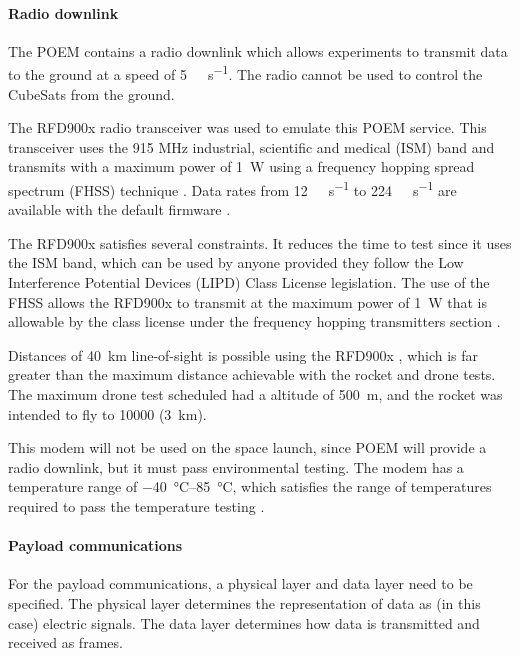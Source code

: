 \documentclass[a4paper,11pt]{article}
\begin{document}
\paragraph{Radio downlink}

The POEM contains a radio downlink which allows experiments to transmit data to the ground at a speed of \SI{5}{\kilo\bit\per\second}. The radio cannot be used to control the CubeSats from the ground.


The RFD900x radio transceiver was used to emulate this POEM service. This transceiver uses the 915 MHz industrial, scientific and medical (ISM) band and transmits with a maximum power of \SI{1}{\watt} using a frequency hopping spread spectrum (FHSS) technique \cite{rfdesign2020rfd900x}. Data rates from \SI{12}{\kilo\bit\per\second} to \SI{224}{\kilo\bit\per\second} are available with the default firmware \cite{rfdesign2020rfd900x}.

The RFD900x satisfies several constraints. It reduces the time to test since it uses the ISM band, which can be used by anyone provided they follow the  Low Interference Potential Devices (LIPD) Class License legislation. The use of the FHSS allows the RFD900x to transmit at the maximum power of \SI{1}{\watt} that is allowable by the class license under the frequency hopping transmitters section \cite{australia2015radiocommunications}.

Distances of \SI{40}{\kilo\metre} line-of-sight is possible using the RFD900x \cite{rfdesign2020rfd900x}, which is far greater than the maximum distance achievable with the rocket and drone tests. The maximum drone test scheduled had a altitude of \SI{500}{\metre}, and the rocket was intended to fly to \SI{10000}{\feet} (\SI{3}{\kilo\metre}).

This modem will not be used on the space launch, since POEM will provide a radio downlink, but it must pass environmental testing. The modem has a temperature range of \SIrange{-40}{85}{\degreeCelsius}, which satisfies the range of temperatures required to pass the temperature testing \cite{rfdesign2020rfd900x}.

\paragraph{Payload communications}
For the payload communications, a physical layer and data layer need to be specified. The physical layer determines the representation of data as (in this case) electric signals. The data layer determines how data is transmitted and received as frames.
\end{document}
